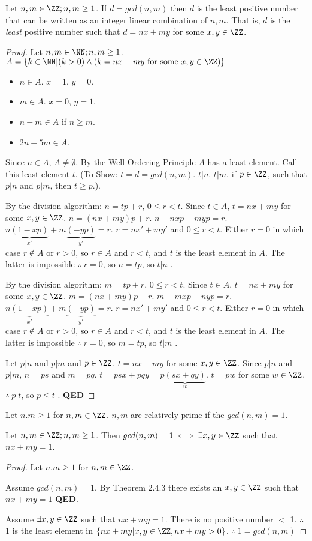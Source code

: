 \begin{theorem}[Textbook 2.4.3] Let $n,m \in \ZZ; n,m \ge 1$.
If $d=gcd(n,m)$ then $d$ is the least positive number that can be written as an integer linear combination of $n,m$. That is, $d$ is the \emph{least} positive number such that $d=nx+my$ for some $x,y \in \ZZ$.
\end{theorem}
\begin{proof}Let $n,m\in\NN;n,m\ge1$. $A = \left\{ k\in\NN | (k > 0) \wedge (k = nx+my \text{ for some } x,y \in \ZZ) \right\}$
    \begin{itemize}
    \item $n\in A$. $x=1$, $y=0$.
    \item $m\in A$. $x=0$, $y=1$.
    \item $n-m \in A$ if $n\ge m$.
    \item $2n+5m\in A$.
    \end{itemize}
Since $n\in A$, $A \ne \emptyset$. By the Well Ordering Principle $A$ has a least element. Call this least element $t$. (To Show: $t=d=gcd(n,m)$. $t|n$. $t|m$. if $p\in\ZZ$, such that $p|n$ and $p|m$, then $t\ge p$.).

By the division algorithm: $n=tp+r$, $0 \le r < t$. Since $t\in A$, $t = nx+my$ for some $x,y\in\ZZ$. $n =(nx+my)p + r$. $n-nxp-myp=r$. $n\underbrace{(1-xp)}_{x'}+m\underbrace{(-yp)}_{y'} = r$. $r=nx'+my'$ and $0\le r < t$. Either $r=0$ in which case $r\notin A$ or $r>0$, so $r\in A$ and $r<t$, and $t$ is the least element in $A$. The latter is impossible $\therefore\ r=0$, so $n=tp$, so $t|n$ \checkmark.

By the division algorithm: $m=tp+r$, $0 \le r < t$. Since $t\in A$, $t = nx+my$ for some $x,y\in\ZZ$. $m =(nx+my)p + r$. $m-mxp-nyp=r$. $n\underbrace{(1-xp)}_{x'}+m\underbrace{(-yp)}_{y'} = r$. $r=nx'+my'$ and $0\le r < t$. Either $r=0$ in which case $r\notin A$ or $r>0$, so $r\in A$ and $r<t$, and $t$ is the least element in $A$. The latter is impossible $\therefore\ r=0$, so $m=tp$, so $t|m$ \checkmark.

Let $p|n$ and $p|m$ and $p\in\ZZ$. $t=nx+my$ for some $x,y\in\ZZ$. Since $p|n$ and $p|m$, $n=ps$ and $m=pq$. $t=psx+pqy=p\underbrace{(sx+qy)}_w$. $t=pw$ for some $w\in\ZZ$. $\therefore\ p|t$, so $p \le t$ \checkmark. \textbf{QED}
\end{proof}
\begin{definition}[2.2.4]Let $n.m\ge 1$ for $n,m\in\ZZ$. $n,m$ are relatively prime if the $gcd(n,m)=1$.
\end{definition}
\begin{definition}[2.2.5]Let $n,m\in\ZZ; n,m\ge 1$. Then $gcd(n,m)=1 \iff \exists x,y\in\ZZ$ such that $nx+my=1$.
\end{definition}
\begin{proof}
Let $n.m\ge 1$ for $n,m\in\ZZ$.

Assume $gcd(n,m)=1$. By Theorem 2.4.3 there exists an $x,y\in\ZZ$ such that $nx+my=1$ \textbf{QED}.

Assume $\exists x,y\in\ZZ$ such that $nx+my=1$. There is no positive number $<$ 1. $\therefore$ 1 is the least element in $\left\{ nx+my| x,y\in\ZZ, nx+my>0 \right\}$. $\therefore\ 1=gcd(n,m)$
\end{proof}


